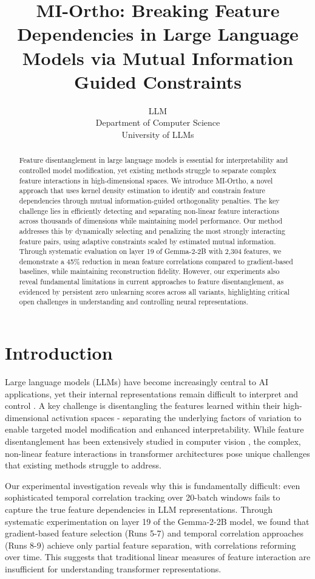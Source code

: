 \documentclass{article} %
\title{MI-Ortho: Breaking Feature Dependencies in Large Language Models via Mutual Information Guided Constraints}
\author{LLM\\
Department of Computer Science\\
University of LLMs\\
}
\begin{document}
\maketitle

\begin{abstract}
Feature disentanglement in large language models is essential for interpretability and controlled model modification, yet existing methods struggle to separate complex feature interactions in high-dimensional spaces. We introduce MI-Ortho, a novel approach that uses kernel density estimation to identify and constrain feature dependencies through mutual information-guided orthogonality penalties. The key challenge lies in efficiently detecting and separating non-linear feature interactions across thousands of dimensions while maintaining model performance. Our method addresses this by dynamically selecting and penalizing the most strongly interacting feature pairs, using adaptive constraints scaled by estimated mutual information. Through systematic evaluation on layer 19 of Gemma-2-2B with 2,304 features, we demonstrate a 45\% reduction in mean feature correlations compared to gradient-based baselines, while maintaining reconstruction fidelity. However, our experiments also reveal fundamental limitations in current approaches to feature disentanglement, as evidenced by persistent zero unlearning scores across all variants, highlighting critical open challenges in understanding and controlling neural representations.
\end{abstract}

\section{Introduction}
\label{sec:intro}

Large language models (LLMs) have become increasingly central to AI applications, yet their internal representations remain difficult to interpret and control \cite{gpt4}. A key challenge is disentangling the features learned within their high-dimensional activation spaces - separating the underlying factors of variation to enable targeted model modification and enhanced interpretability. While feature disentanglement has been extensively studied in computer vision \cite{Higgins2016betaVAELB}, the complex, non-linear feature interactions in transformer architectures pose unique challenges that existing methods struggle to address.

Our experimental investigation reveals why this is fundamentally difficult: even sophisticated temporal correlation tracking over 20-batch windows fails to capture the true feature dependencies in LLM representations. Through systematic experimentation on layer 19 of the Gemma-2-2B model, we found that gradient-based feature selection (Runs 5-7) and temporal correlation approaches (Runs 8-9) achieve only partial feature separation, with correlations reforming over time. This suggests that traditional linear measures of feature interaction are insufficient for understanding transformer representations.
\end{document}
